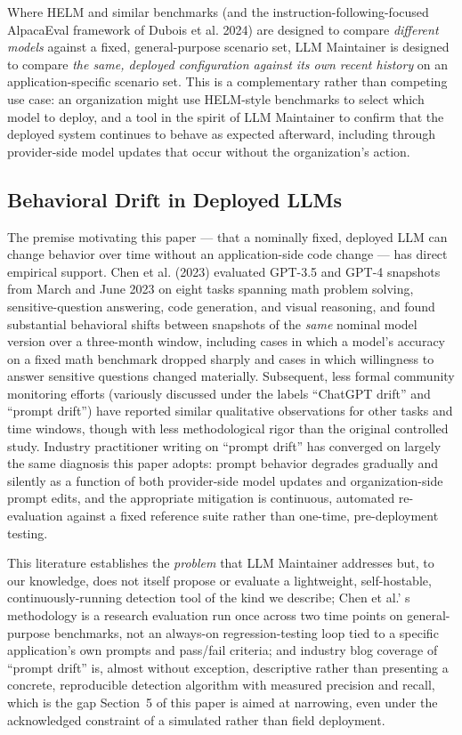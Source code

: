\documentclass[11pt,a4paper]{article}
\begin{document}
Where HELM and similar benchmarks (and the instruction-following-focused
AlpacaEval framework of Dubois et al. 2024) are designed to compare
\emph{different models} against a fixed, general-purpose scenario set,
LLM Maintainer is designed to compare \emph{the same, deployed
configuration against its own recent history} on an application-specific
scenario set. This is a complementary rather than competing use case: an
organization might use HELM-style benchmarks to select which model to
deploy, and a tool in the spirit of LLM Maintainer to confirm that the
deployed system continues to behave as expected afterward, including
through provider-side model updates that occur without the
organization's action.

\subsection{Behavioral Drift in Deployed LLMs}

The premise motivating this paper --- that a nominally fixed, deployed
LLM can change behavior over time without an application-side code
change --- has direct empirical support. Chen et al. (2023) evaluated
GPT-3.5 and GPT-4 snapshots from March and June 2023 on eight tasks
spanning math problem solving, sensitive-question answering, code
generation, and visual reasoning, and found substantial behavioral
shifts between snapshots of the \emph{same} nominal model version over a
three-month window, including cases in which a model's
accuracy on a fixed math benchmark dropped sharply and cases in which
willingness to answer sensitive questions changed materially.
Subsequent, less formal community monitoring efforts (variously
discussed under the labels ``ChatGPT drift'' and ``prompt drift'') have
reported similar qualitative observations for other tasks and time
windows, though with less methodological rigor than the original
controlled study. Industry practitioner writing on ``prompt drift'' has
converged on largely the same diagnosis this paper adopts: prompt
behavior degrades gradually and silently as a function of both
provider-side model updates and organization-side prompt edits, and the
appropriate mitigation is continuous, automated re-evaluation against a
fixed reference suite rather than one-time, pre-deployment testing.

This literature establishes the \emph{problem} that LLM Maintainer
addresses but, to our knowledge, does not itself propose or evaluate a
lightweight, self-hostable, continuously-running detection tool of the
kind we describe; Chen et al.' s methodology is a
research evaluation run once across two time points on general-purpose
benchmarks, not an always-on regression-testing loop tied to a specific
application's own prompts and pass/fail criteria; and
industry blog coverage of ``prompt drift'' is, almost without exception,
descriptive rather than presenting a concrete, reproducible detection
algorithm with measured precision and recall, which is the gap Section~5
of this paper is aimed at narrowing, even under the acknowledged
constraint of a simulated rather than field deployment.
\end{document}
